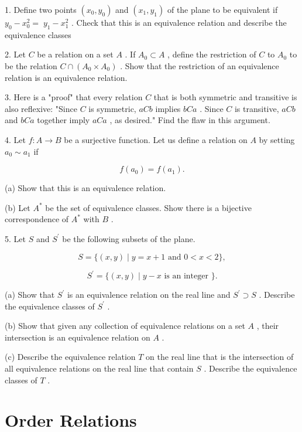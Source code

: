\documentclass[10pt]{article}
\begin{document}
1. Define two points \(\left( {{x}_{0},{y}_{0}}\right)\) and \(\left( {{x}_{1},{y}_{1}}\right)\) of the plane to be equivalent if \({y}_{0} - {x}_{0}^{2} = \; {y}_{1} - {x}_{1}^{2}\) . Check that this is an equivalence relation and describe the equivalence classes

2. Let \(C\) be a relation on a set \(A\) . If \({A}_{0} \subset  A\) , define the restriction of \(C\) to \({A}_{0}\) to be the relation \(C \cap  \left( {{A}_{0} \times  {A}_{0}}\right)\) . Show that the restriction of an equivalence relation is an equivalence relation.

3. Here is a "proof" that every relation \(C\) that is both symmetric and transitive is also reflexive: "Since \(C\) is symmetric, \({aCb}\) implies \({bCa}\) . Since \(C\) is transitive, \({aCb}\) and \({bCa}\) together imply \({aCa}\) , as desired." Find the flaw in this argument.

4. Let \(f : A \rightarrow  B\) be a surjective function. Let us define a relation on \(A\) by setting \({a}_{0} \sim  {a}_{1}\) if

\[
f\left( {a}_{0}\right)  = f\left( {a}_{1}\right) .
\]

(a) Show that this is an equivalence relation.

(b) Let \({A}^{ * }\) be the set of equivalence classes. Show there is a bijective correspondence of \({A}^{ * }\) with \(B\) .

5. Let \(S\) and \({S}^{\prime }\) be the following subsets of the plane.

\[
S = \{ \left( {x,y}\right)  \mid  y = x + 1\text{ and }0 < x < 2\} ,
\]

\[
{S}^{\prime } = \{ \left( {x,y}\right)  \mid  y - x\text{ is an integer }\} .
\]

(a) Show that \({S}^{\prime }\) is an equivalence relation on the real line and \({S}^{\prime } \supset  S\) . Describe the equivalence classes of \({S}^{\prime }\) .

(b) Show that given any collection of equivalence relations on a set \(A\) , their intersection is an equivalence relation on \(A\) .

(c) Describe the equivalence relation \(T\) on the real line that is the intersection of all equivalence relations on the real line that contain \(S\) . Describe the equivalence classes of \(T\) .

\section*{Order Relations}
\end{document}
